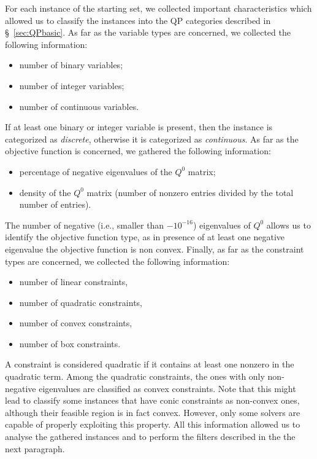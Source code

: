For each instance of the starting set, we collected important characteristics
which allowed us to classify the instances into the QP categories described in
\S~\ref{sec:QPbasic}. As far as the variable types are concerned, we
collected the following information:
%
\begin{itemize}
 \item number of binary variables; %
 \item number of integer variables; %
 \item number of continuous variables. %
\end{itemize}
%
If at least one binary or integer variable is present, then the instance is
categorized as \emph{discrete}, otherwise it is categorized as \emph{continuous}.
As far as the objective function is concerned, we gathered the following
information:
%
\begin{itemize}
 \item percentage of negative eigenvalues of the $Q^0$ matrix;
 \item density of the $Q^0$ matrix (number of nonzero entries divided by the total
       number of entries). %
\end{itemize}
%

The number of negative (i.e., smaller than $-10^{-16}$) eigenvalues of $Q^0$ allows us to identify the
objective function type, as in presence of at least one negative eigenvalue
the objective function is non convex. Finally, as far as the constraint types
are concerned, we collected the following information:
%
\begin{itemize}
 \item number of linear constraints, %
 \item number of quadratic constraints, %
 \item number of convex constraints, %
 \item number of box constraints. %
\end{itemize}
%
A constraint is considered quadratic if it contains at least one nonzero in
the quadratic term. Among the quadratic constraints, the ones with only
non-negative eigenvalues are classified as convex constraints.
Note that this might lead to classify some instances that have conic constraints as non-convex ones, although their feasible region is in fact convex. However, only some solvers are capable of properly exploiting this property.
 All this information allowed us to analyse the gathered instances and to perform the
filters described in the the next paragraph.

